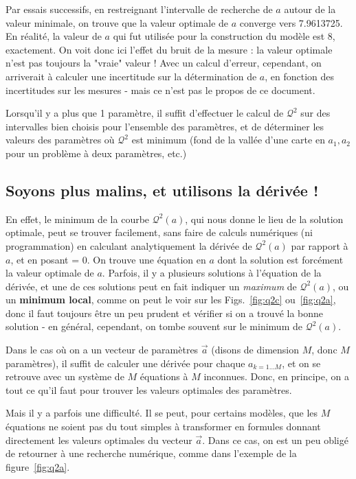 Par essais successifs, en restreignant l'intervalle de recherche de $a$ autour de la valeur minimale, on trouve que la valeur optimale de $a$ converge vers 7.9613725. En réalité, la valeur de $a$ qui fut utilisée pour la construction du modèle est 8, exactement. On voit donc ici l'effet du bruit de la mesure : la valeur optimale n'est pas toujours la "vraie" valeur ! Avec un calcul d'erreur, cependant, on arriverait à calculer une incertitude sur la détermination de $a$, en fonction des incertitudes sur les mesures - mais ce n'est pas le propos de ce document.

Lorsqu'il y a plus que 1 paramètre, il suffit d'effectuer le calcul de $\mathcal{Q}^2$ sur des intervalles bien choisis pour l'ensemble des paramètres, et de déterminer les valeurs des paramètres où $\mathcal{Q}^2$ est minimum (fond de la vallée d'une carte en $a_1,a_2$ pour un problème à deux paramètres, etc.)

\subsection{Soyons plus malins, et utilisons la dérivée !}

En effet, le minimum de la courbe $\mathcal{Q}^2(a)$, qui nous donne le lieu de la solution optimale, peut se trouver facilement, sans faire de calculs numériques (ni programmation) en calculant analytiquement la dérivée de $\mathcal{Q}^2(a)$ par rapport à $a$, et en posant = 0. On trouve une équation en $a$ dont la solution est forcément la valeur optimale de $a$. Parfois, il y a plusieurs solutions à l'équation de la dérivée, et une de ces solutions peut en fait indiquer un \textit{maximum} de $\mathcal{Q}^2(a)$, ou un \textbf{minimum local}, comme on peut le voir sur les Figs.~\ref{fig:q2c} ou~\ref{fig:q2a}, donc il faut toujours être un peu prudent et vérifier si on a trouvé la bonne solution - en général, cependant, on tombe souvent sur le minimum de $\mathcal{Q}^2(a)$.

Dans le cas où on a un vecteur de paramètres $\vec{a}$ (disons de dimension $M$, donc $M$ paramètres), il suffit de calculer une dérivée pour chaque $a_{k=1\dots M}$, et on se retrouve avec un système de $M$ équations à $M$ inconnues. Donc, en principe, on a tout ce qu'il faut pour trouver les valeurs optimales des paramètres.

Mais il y a parfois une difficulté. Il se peut, pour certains modèles, que les $M$ équations ne soient pas du tout simples à transformer en formules donnant directement les valeurs optimales du vecteur $\vec{a}$. Dans ce cas, on est un peu obligé de retourner à une recherche numérique, comme dans l'exemple de la figure~\ref{fig:q2a}.

